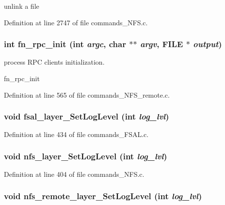 unlink a file 

Definition at line 2747 of file commands\_\-NFS.c.
\subsubsection[{fn\_\-rpc\_\-init}]{\setlength{\rightskip}{0pt plus 5cm}int fn\_\-rpc\_\-init (int {\em argc}, \/  char $\ast$$\ast$ {\em argv}, \/  FILE $\ast$ {\em output})}\label{commands_8h_a4e73bacfb224496a2393bbc05ced1d76}
process RPC clients initialization.

fn\_\-rpc\_\-init 

Definition at line 565 of file commands\_\-NFS\_\-remote.c.
\subsubsection[{fsal\_\-layer\_\-SetLogLevel}]{\setlength{\rightskip}{0pt plus 5cm}void fsal\_\-layer\_\-SetLogLevel (int {\em log\_\-lvl})}\label{commands_8h_a8d06115f7aed032f29bab10e1bafc79e}


Definition at line 434 of file commands\_\-FSAL.c.
\subsubsection[{nfs\_\-layer\_\-SetLogLevel}]{\setlength{\rightskip}{0pt plus 5cm}void nfs\_\-layer\_\-SetLogLevel (int {\em log\_\-lvl})}\label{commands_8h_ab887a5c5a0911df2c6be04b92c3a9693}


Definition at line 404 of file commands\_\-NFS.c.
\subsubsection[{nfs\_\-remote\_\-layer\_\-SetLogLevel}]{\setlength{\rightskip}{0pt plus 5cm}void nfs\_\-remote\_\-layer\_\-SetLogLevel (int {\em log\_\-lvl})}\label{commands_8h_aafddec7649e50bfe452db28ba44df4b7}


